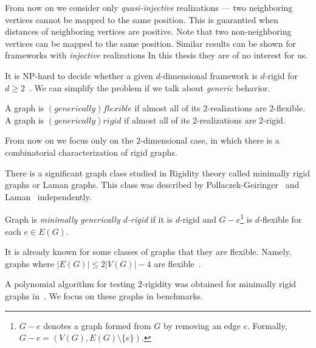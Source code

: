 From now on we consider only \emph{quasi-injective} realizations ---
two neighboring vertices cannot be mapped to the same position.
This is guarantied when distances of neighboring vertices are positive.
Note that two non-neighboring vertices can be mapped to the same position.
Similar results can be shown for frameworks with \emph{injective} realizations
In this thesis they are of no interest for us.

It is NP-hard to decide whether a given \( d \)-dimensional framework is
\( d \)-rigid for \( d \ge 2 \)~\cite{d_rigidity_hardness}.
We can simplify the problem if we talk about \emph{generic}
behavior.
%
\begin{definition}
	A graph is \( (generically) flexible \) if almost all of
	its \( 2 \)-realizations are \( 2 \)-flexible.
	A graph is \( (generically) rigid \) if almost all of
	its \( 2 \)-realizations are \( 2 \)-rigid.
\end{definition}
%

From now on we focus only on the \( 2 \)-dimensional case,
in which there is a combinatorial characterization of rigid graphs.

There is a significant graph class studied in Rigidity theory
called minimally rigid graphs or Laman graphs.
This class was described by Pollaczek-Geiringer~\cite{polzacek_1927}
and Laman~\cite{laman_1970} independently.
%
\begin{definition}
	Graph is \emph{minimally generically \( d \)-rigid} if it is \( d \)-rigid
	and \( G - e \)\footnote{
		\( G - e \) denotes a graph formed from \( G \) by removing an edge \( e \).
		Formally, \( G - e = (V(G), E(G) \setminus \{e\}) \).
	}
	is \(d\)-flexible for each \( e \in E(G) \).
\end{definition}
%

It is already known for some classes of graphs that they are flexible.
Namely, graphs where \( |E(G)| \le 2|V(G)| - 4 \)
are flexible~\cite{stable_cuts_2v_4}.

A polynomial algorithm for testing \( 2 \)-rigidity was obtained
for minimally rigid graphs in~\cite{polynomial-min-rigid}.
We focus on these graphs in benchmarks.

